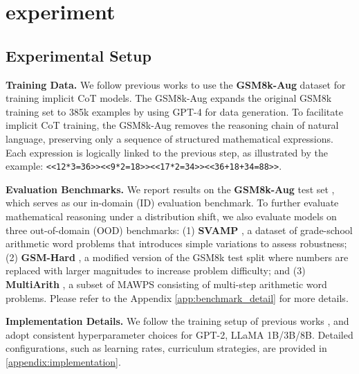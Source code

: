 \section{experiment}
\subsection{Experimental Setup}
\noindent \textbf{Training Data.} We follow previous works \citep{icot, hao2024coconut} to use the \textbf{GSM8k-Aug} dataset \cite{icot} for training implicit CoT models.
The GSM8k-Aug expands the original GSM8k training set \citep{cobbe2021trainingverifierssolvemath} to 385k examples by using GPT-4 for data generation.
To facilitate implicit CoT training, the GSM8k-Aug removes the reasoning chain of natural language, preserving only a sequence of structured mathematical expressions.
Each expression is logically linked to the previous step, as illustrated by the example: \texttt{<<12*3=36>><<9*2=18>><<17*2=34>><<36+18+34=88>>}.

\noindent \textbf{Evaluation Benchmarks.}
We report results on the \textbf{GSM8k-Aug} test set \citep{cobbe2021trainingverifierssolvemath}, which serves as our in-domain (ID) evaluation benchmark.
To further evaluate mathematical reasoning under a distribution shift, we also evaluate models on three out-of-domain (OOD) benchmarks:
(1) \textbf{SVAMP} \citep{patel-etal-2021-nlp}, a dataset of grade-school arithmetic word problems that introduces simple variations to assess robustness;  
(2) \textbf{GSM-Hard} \citep{gao2022pal}, a modified version of the GSM8k test split where numbers are replaced with larger magnitudes to increase problem difficulty; and  
(3) \textbf{MultiArith} \citep{roy2016solvinggeneralarithmeticword}, a subset of MAWPS \citep{koncel-kedziorski-etal-2016-mawps} consisting of multi-step arithmetic word problems.  
Please refer to the Appendix \ref{app:benchmark_detail} for more details.




\noindent \textbf{Implementation Details.} We follow the training setup of previous works \citep{hao2024coconut,shen2025codi}, and adopt consistent hyperparameter choices for GPT-2, LLaMA 1B/3B/8B. Detailed configurations, such as learning rates, curriculum strategies, are provided in \cref{appendix:implementation}.

